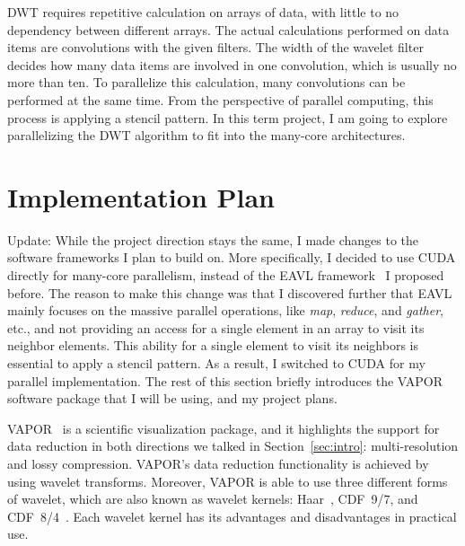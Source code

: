 \documentclass{article}
\begin{document}
DWT requires repetitive calculation on arrays of data, with little to no
dependency between different arrays.
%
The actual calculations performed on data items are convolutions
with the given filters. 
%
The width of the wavelet filter decides how many data items are 
involved in one convolution, which is usually no more than ten.
%
To parallelize this calculation, many convolutions can be performed
at the same time.
%
From the perspective of parallel computing, this process is applying
a stencil pattern.
%
%
In this term project, I am going to explore parallelizing the DWT algorithm 
to fit into the many-core architectures.


\section{Implementation Plan}
\label{sec:plan}
%
Update: 
%
While the project direction stays the same, I made changes to the 
software frameworks I plan to build on.
%
More specifically, I decided to use CUDA directly for many-core parallelism,
instead of the EAVL framework~\cite{meredith2012distributed} I proposed before.
%
The reason to make this change was that I discovered further that EAVL 
mainly focuses on the massive parallel operations, like \textit{map}, 
\textit{reduce}, and \textit{gather}, etc.,
and not providing an access for a single element in an array to visit
its neighbor elements.
%
This ability for a single element to visit its neighbors is essential
to apply a stencil pattern.
%
As a result, I switched to CUDA for my parallel implementation.
%
The rest of this section briefly introduces the VAPOR software package that
I will be using, and my project plans.



VAPOR~\cite{clyne2007interactive}
is a scientific visualization package, and it highlights the 
support for data reduction in both directions we talked in
Section~\ref{sec:intro}: multi-resolution and lossy compression.
%
VAPOR's data reduction functionality is achieved by using wavelet transforms.
%
Moreover, VAPOR is able to use three different forms of wavelet, which 
are also known as wavelet kernels: Haar~\cite{haar1910theorie}, 
CDF~9/7, and CDF~8/4~\cite{cohen1992biorthogonal}.
%
Each wavelet kernel has its advantages and disadvantages in practical use.
\end{document}
